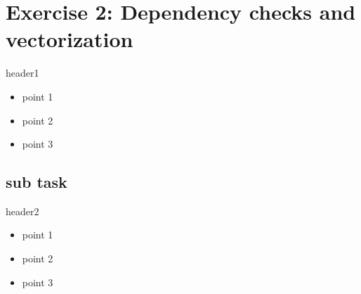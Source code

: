 \section{Exercise 2: Dependency checks and vectorization}
\begin{frame}{header1}
\begin{itemize}
\item point 1
\item point 2
\item point 3
\end{itemize}
\end{frame}

\subsection{sub task}
\begin{frame}{header2}
\begin{itemize}
\item point 1
\item point 2
\item point 3
\end{itemize}
\end{frame}
